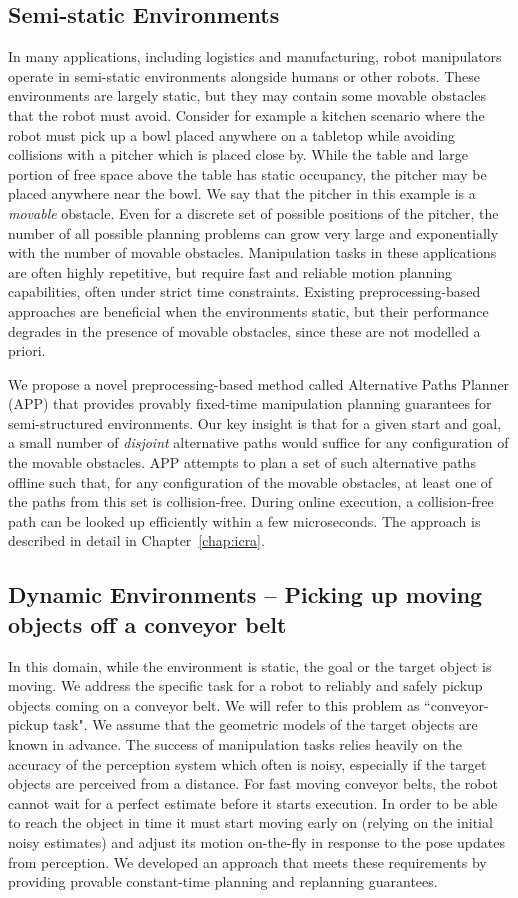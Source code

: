 \documentclass[a4paper]{report}
\begin{document}
\subsection{Semi-static Environments}
In many applications, including logistics and manufacturing, robot manipulators operate in semi-static environments alongside humans or other robots. These environments are largely static, but they may contain some movable obstacles that the robot must avoid.
Consider for example a kitchen scenario where the robot must pick up a bowl placed anywhere on a tabletop while avoiding collisions with a pitcher which is placed close by. While the table and large portion of free space above the table has static occupancy, the pitcher may be placed anywhere near the bowl. We say that the pitcher in this example is a \emph{movable} obstacle. Even for a discrete set of possible positions of the pitcher, the number of all possible planning problems can grow very large and exponentially with the number of movable obstacles.
Manipulation tasks in these applications are often highly repetitive, but require fast and reliable motion planning capabilities, often under strict time constraints. Existing preprocessing-based approaches are beneficial when the environments static, but their performance degrades in the presence of movable obstacles, since these are not modelled a priori.

We propose a novel preprocessing-based method called Alternative Paths Planner (APP) that provides provably fixed-time manipulation planning guarantees for semi-structured environments. Our key insight is that for a given start and goal, a small number of \emph{disjoint} alternative paths would suffice for any configuration of the movable obstacles. APP attempts to plan a set of such alternative paths offline such that, for any configuration of the movable obstacles, at least one of the paths from this set is collision-free. During online execution, a collision-free path can be looked up efficiently within a few microseconds. The approach is described in detail in Chapter~\ref{chap:icra}.

\subsection{Dynamic Environments -- Picking up moving objects off a conveyor belt}
In this domain, while the environment is static, the goal or the target object is moving. We address the specific task for a robot to reliably and safely pickup objects coming on a conveyor belt. We will refer to this problem as ``conveyor-pickup task". We assume that the geometric models of the target objects are known in advance. The success of manipulation tasks relies heavily on the accuracy of the perception system which often is noisy, especially if the target objects are perceived from a distance. For fast moving conveyor belts, the robot cannot wait for a perfect estimate before it starts execution. In order to be able to reach the object in time it must start moving early on (relying on the initial noisy estimates) and adjust its motion on-the-fly in response to the pose updates from perception. We developed an approach that meets these requirements by providing provable constant-time planning and replanning guarantees.
\end{document}
